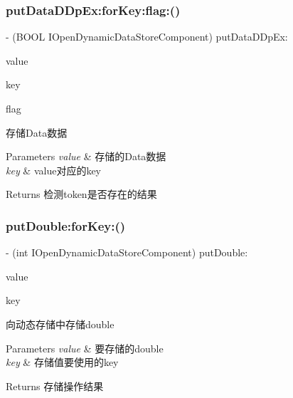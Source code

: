 \subsubsection{\texorpdfstring{put\+Data\+D\+Dp\+Ex\+:for\+Key\+:flag\+:()}{putDataDDpEx:forKey:flag:()}}
{\footnotesize\ttfamily -\/ (B\+O\+OL I\+Open\+Dynamic\+Data\+Store\+Component) put\+Data\+D\+Dp\+Ex\+: \begin{DoxyParamCaption}\item[{(N\+S\+Data $\ast$)}]{value }\item[{forKey:(N\+S\+String $\ast$)}]{key }\item[{flag:(int)}]{flag }\end{DoxyParamCaption}}

存储\+Data数据 
\begin{DoxyParams}{Parameters}
{\em value} & 存储的\+Data数据 \\
\hline
{\em key} & value对应的key \\
\hline
\end{DoxyParams}
\begin{DoxyReturn}{Returns}
检测token是否存在的结果 
\end{DoxyReturn}
\mbox{\label{protocol_i_open_dynamic_data_store_component_01-p_ad7745ae9edc35a26280ff479268727c0}} 
\subsubsection{\texorpdfstring{put\+Double\+:for\+Key\+:()}{putDouble:forKey:()}}
{\footnotesize\ttfamily -\/ (int I\+Open\+Dynamic\+Data\+Store\+Component) put\+Double\+: \begin{DoxyParamCaption}\item[{(double)}]{value }\item[{forKey:(N\+S\+String $\ast$)}]{key }\end{DoxyParamCaption}}

向动态存储中存储double 
\begin{DoxyParams}{Parameters}
{\em value} & 要存储的double \\
\hline
{\em key} & 存储值要使用的key \\
\hline
\end{DoxyParams}
\begin{DoxyReturn}{Returns}
存储操作结果 
\end{DoxyReturn}
\mbox{\label{protocol_i_open_dynamic_data_store_component_01-p_aba3ce603ceabc769db3c830ac6b4c359}} 
